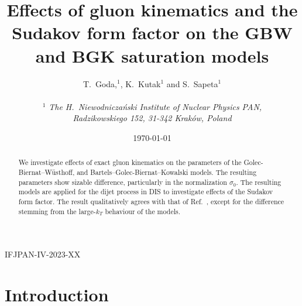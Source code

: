 \documentclass[11pt]{article}
\author{
T.~Goda,$^1$, K.~Kutak$^{1}$ and S.~Sapeta$^1$\\\,\\
$^1$ 
{\small\it The H.\ Niewodnicza\'nski Institute of Nuclear Physics PAN,}\\ 
{\small\it Radzikowskiego 152, 31-342 Krak\'ow, Poland}\\%
}
\title{Effects of gluon kinematics and the Sudakov form factor on the GBW and BGK saturation models}
\date{\today}
\numberwithin{equation}{section}
\numberwithin{table}{section}
\numberwithin{figure}{section}
\begin{document}
\maketitle

\vspace{-25em}
\begin{flushright}
  IFJPAN-IV-2023-XX\\
\end{flushright}
\vspace{20em}

\begin{abstract}
We investigate effects of exact gluon kinematics on the parameters of the
Golec-Biernat--W\"usthoff, and Bartels--Golec-Biernat--Kowalski models. The
resulting parameters show sizable difference, particularly in the normalization
$\sigma_0$. The resulting models are applied for the dijet process in DIS to
investigate effects of the Sudakov form factor.  The result qualitatively agrees
with that of Ref.~\cite{vanHameren:2021sqc}, except for the difference stemming
from the large-$k_T$ behaviour of the models.
\end{abstract}

\section{Introduction}
\end{document}

